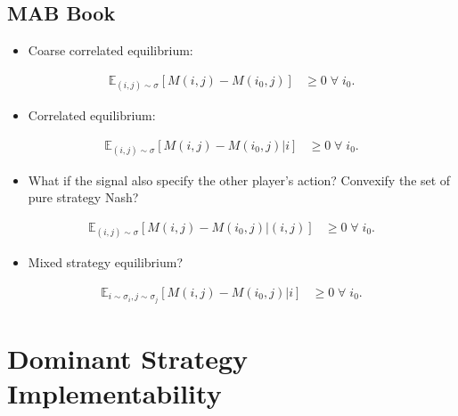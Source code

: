 \documentclass{article}
\begin{document}
\subsection{MAB Book}
\begin{itemize}
\item Coarse correlated equilibrium:
\end{itemize}\begin{align*}
\mathbb{E}_{\left(i, j\right)\sim \sigma}\left[M\left(i, j\right) - M\left(i_{0}, j\right)\right] &\geq  0 \;\forall\; i_{0} .
\end{align*}
\begin{itemize}
\item Correlated equilibrium:
\end{itemize}\begin{align*}
\mathbb{E}_{\left(i, j\right)\sim \sigma}\left[M\left(i, j\right) - M\left(i_{0}, j\right) | i\right] &\geq  0 \;\forall\; i_{0} .
\end{align*}
\begin{itemize}
\item What if the signal also specify the other player's action? Convexify the set of pure strategy Nash?
\end{itemize}\begin{align*}
\mathbb{E}_{\left(i, j\right)\sim \sigma}\left[M\left(i, j\right) - M\left(i_{0}, j\right) | \left(i, j\right)\right] &\geq  0 \;\forall\; i_{0} .
\end{align*}
\begin{itemize}
\item Mixed strategy equilibrium?
\end{itemize}\begin{align*}
\mathbb{E}_{i\sim \sigma_{i}, j\sim \sigma_{j}}\left[M\left(i, j\right) - M\left(i_{0}, j\right) | i\right] &\geq  0 \;\forall\; i_{0} .
\end{align*}




\section{Dominant Strategy Implementability} 
\end{document}
